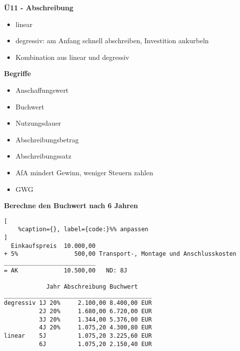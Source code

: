 \textbf{Ü11 - Abschreibung}

\begin{itemize}
\item
  linear
\item
  degressiv: am Anfang schnell abschreiben, Investition ankurbeln
\item
  Kombination aus linear und degressiv
\end{itemize}

\textbf{Begriffe}

\begin{itemize}
\item
  Anschaffungswert
\item
  Buchwert
\item
  Nutzungsdauer
\item
  Abschreibungsbetrag
\item
  Abschreibungssatz
\item
  AfA mindert Gewinn, weniger Steuern zahlen
\item
  GWG
\end{itemize}

\textbf{Berechne den Buchwert nach 6 Jahren}

\lstset{language=Python}%
\begin{lstlisting}[
	%caption={}, label={code:}%% anpassen
]
  Einkaufspreis  10.000,00
+ 5%                500,00 Transport-, Montage und Anschlusskosten
__________________________
= AK             10.500,00   ND: 8J

            Jahr Abschreibung Buchwert
__________________________________________           
degressiv 1J 20%     2.100,00 8.400,00 EUR
          2J 20%     1.680,00 6.720,00 EUR
          3J 20%     1.344,00 5.376,00 EUR      
          4J 20%     1.075,20 4.300,80 EUR
linear    5J         1.075,20 3.225,60 EUR
          6J         1.075,20 2.150,40 EUR
\end{lstlisting}
